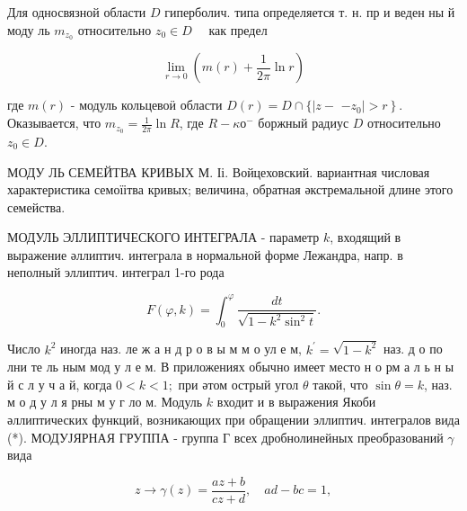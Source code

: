 \documentclass[10pt]{article}
\begin{document}
Для односвязной области $D$ гиперболич. типа определяется т. н. пр и веден ны й моду ль $m_{z_{0}}$ относительно $z_{0} \in D \quad$ как предел



\[

\lim _{r \rightarrow 0}\left(m(r)+\frac{1}{2 \pi} \ln r\right)

\]



где $m(r)$ - модуль кольцевоӥ области $D(r)=D \cap\{\mid z-$ $\left.-z_{0} \mid>r\right\}$. Оказывается, что $m_{z_{0}}=\frac{1}{2 \pi} \ln R$, где $R-\kappa о{ }^{-}$ боржный радиус $D$ относительно $z_{0} \in D$.



МОДУ ЛЬ СЕМЕЙТВА КРИВЫХ М. Іі. Войцеховский. вариантная числовая характеристика семоїітва кривых; величина, обратная әкстремальной длине этого семейства.



МОДУЛЬ ЭЛЛИПТИЧЕСКОГО ИНТЕГРАЛА - параметр $k$, входящий в выражение әллиптич. интеграла в нормальной форме Лежандра, напр. в неполный эллиптич. интеграл 1-го рода



\[

F(\varphi, k)=\int_{0}^{\varphi} \frac{d t}{\sqrt{1-k^{2} \sin ^{2} t}} .

\]



Число $k^{2}$ иногда наз. ле ж а н д р о в ы м м о ул е м, $k^{\prime}=\sqrt{1-k^{2}}$ наз. д о по лни те ль ным мод у л е м. В приложениях обычно имеет место н о рм а л ь н ы й с л у ч а й, когда $0<k<1 ;$ при әтом острый угол $\theta$ такой, что $\sin \theta=k$, наз. м о д у л я рны м у г ло м. Модуль $k$ входит и в выражения Якоби әллиптических функций, возникающих при обращении эллиптич. интегралов вида (*). МОДУЈЯРНАЯ ГРУППА - группа $Г$ всех дробнолинейных преобразований $\gamma$ вида



\[

z \longrightarrow \gamma(z)=\frac{a z+b}{c z+d}, \quad a d-b c=1,

\]
\end{document}
